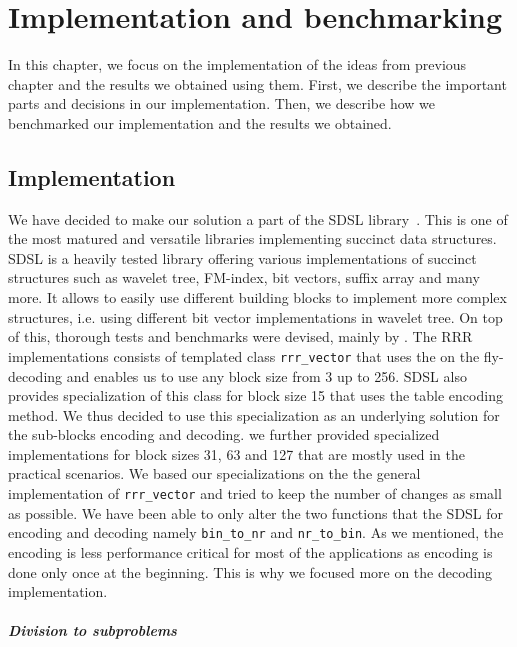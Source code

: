 \chapter{Implementation and benchmarking}
\label{kap:kap4}

In this chapter, we focus on the implementation of the ideas from previous chapter
and the results we obtained using them. First, we describe the important parts and
decisions in our implementation. Then, we describe how we benchmarked our implementation
and the results we obtained.

\section{Implementation}

We have decided to make our solution a part of the SDSL library~\citep{gog2014theory}. This
is one of the most matured and versatile libraries implementing succinct data structures.
SDSL is a heavily tested library offering various implementations of succinct
structures such as wavelet tree, FM-index, bit vectors, suffix array and many more.
It allows to easily use different building blocks to implement more complex structures,
i.e. using different bit vector implementations in wavelet tree. On top of this, thorough
tests and benchmarks were devised, mainly by \cite{gog2014optimized}.
The RRR implementations consists of templated class \texttt{rrr\_vector} that uses the on the fly-decoding
and enables us to use any block size from 3 up to 256. SDSL also provides specialization
of this class for block size 15 that uses the table encoding method. We thus decided to use
this specialization as an underlying solution for the sub-blocks encoding and decoding. we further
provided specialized implementations for block sizes 31, 63 and 127 that are mostly used in the
practical scenarios. We based our specializations on the the general implementation of
\texttt{rrr\_vector} and tried to keep the number of changes as small as possible. We have been able
to only alter the two functions that the SDSL for encoding and decoding namely \texttt{bin\_to\_nr}
and \texttt{nr\_to\_bin}. As we mentioned, the encoding is less performance critical for most of the
applications as encoding is done only once at the beginning. This is why we focused more on the
decoding implementation.

\paragraph{Division to subproblems}

